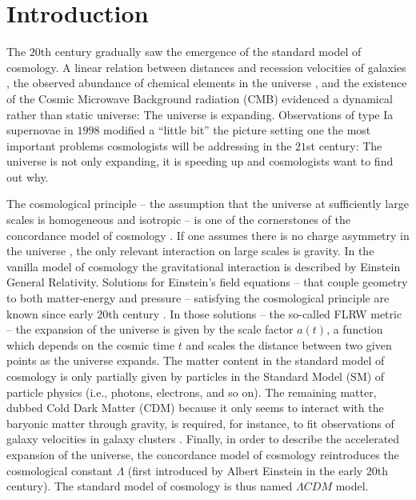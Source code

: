\chapter*{Introduction}
\label{intro} 

The $20$th century gradually saw the emergence of the standard model of cosmology. A linear relation between distances and recession velocities of galaxies , the observed abundance of chemical elements in the universe , and the existence of the Cosmic Microwave Background radiation (CMB)  evidenced a dynamical rather than static universe: The universe is expanding. Observations of type Ia supernovae in $1998$  modified a ``little bit'' the picture setting one the most important problems cosmologists will be addressing in the $21$st century: The universe is not only expanding, it is speeding up and cosmologists want to find out why. 

The cosmological principle -- the assumption that the universe at sufficiently large scales is homogeneous and isotropic -- is one of the cornerstones of the concordance model of cosmology . If one assumes there is no charge asymmetry in the universe , the only relevant interaction on large scales is gravity. In the vanilla model of cosmology the gravitational interaction is described by Einstein General Relativity. Solutions for Einstein's field equations -- that couple geometry to both matter-energy and pressure -- satisfying the cosmological principle are known since early $20$th century . In those solutions -- the so-called FLRW metric -- the expansion of the universe is given by the scale factor $a(t)$, a function which depends on the cosmic time $t$ and scales the distance between two given points as the universe expands. The matter content in the standard model of cosmology is only partially given by particles in the Standard Model (SM) of particle physics (i.e., photons, electrons, and so on). The remaining matter, dubbed Cold Dark Matter (CDM) because it only seems to interact with the baryonic matter through gravity, is required, for instance, to fit observations of galaxy velocities in galaxy clusters . Finally, in order to describe the accelerated expansion of the universe, the concordance model of cosmology reintroduces the cosmological constant $\Lambda$ (first introduced by Albert Einstein in the early $20$th century). The standard model of cosmology is thus named  $\Lambda CDM$ model.

